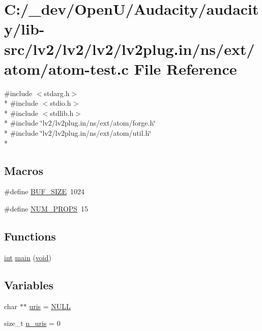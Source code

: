 \hypertarget{atom-test_8c}{}\section{C\+:/\+\_\+dev/\+Open\+U/\+Audacity/audacity/lib-\/src/lv2/lv2/lv2/lv2plug.in/ns/ext/atom/atom-\/test.c File Reference}
\label{atom-test_8c}
{\ttfamily \#include $<$stdarg.\+h$>$}\\*
{\ttfamily \#include $<$stdio.\+h$>$}\\*
{\ttfamily \#include $<$stdlib.\+h$>$}\\*
{\ttfamily \#include \char`\"{}lv2/lv2plug.\+in/ns/ext/atom/forge.\+h\char`\"{}}\\*
{\ttfamily \#include \char`\"{}lv2/lv2plug.\+in/ns/ext/atom/util.\+h\char`\"{}}\\*
\subsection*{Macros}
\begin{DoxyCompactItemize}
\item 
\#define \hyperlink{atom-test_8c_a6821bafc3c88dfb2e433a095df9940c6}{B\+U\+F\+\_\+\+S\+I\+ZE}~1024
\item 
\#define \hyperlink{atom-test_8c_a7ed5a5250fcb64706865f6d6f7d5f427}{N\+U\+M\+\_\+\+P\+R\+O\+PS}~15
\end{DoxyCompactItemize}
\subsection*{Functions}
\begin{DoxyCompactItemize}
\item 
\hyperlink{xmltok_8h_a5a0d4a5641ce434f1d23533f2b2e6653}{int} \hyperlink{atom-test_8c_a840291bc02cba5474a4cb46a9b9566fe}{main} (\hyperlink{sound_8c_ae35f5844602719cf66324f4de2a658b3}{void})
\end{DoxyCompactItemize}
\subsection*{Variables}
\begin{DoxyCompactItemize}
\item 
char $\ast$$\ast$ \hyperlink{atom-test_8c_a42e30b2eba499e78c1647c915bdbb775}{uris} = \hyperlink{px__mixer_8h_a070d2ce7b6bb7e5c05602aa8c308d0c4}{N\+U\+LL}
\item 
size\+\_\+t \hyperlink{atom-test_8c_a6cac288d3639dbff5f61ce54e5af51ff}{n\+\_\+uris} = 0
\end{DoxyCompactItemize}


